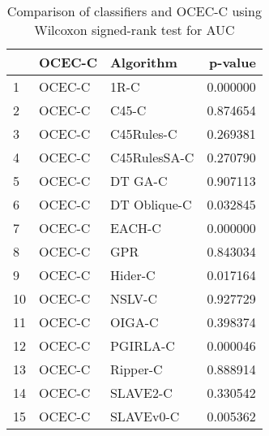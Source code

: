 \begin{table}
\footnotesize
\caption{Comparison of classifiers and OCEC-C using Wilcoxon signed-rank test for AUC}
\label{tab:OCEC-C wilcoxon AUC comparison}
\begin{tabular}{lllr}
\hline
 & OCEC-C & Algorithm & p-value \\
\hline
1 & OCEC-C & 1R-C & 0.000000 \\
2 & OCEC-C & C45-C & 0.874654 \\
3 & OCEC-C & C45Rules-C & 0.269381 \\
4 & OCEC-C & C45RulesSA-C & 0.270790 \\
5 & OCEC-C & DT GA-C & 0.907113 \\
6 & OCEC-C & DT Oblique-C & 0.032845 \\
7 & OCEC-C & EACH-C & 0.000000 \\
8 & OCEC-C & GPR & 0.843034 \\
9 & OCEC-C & Hider-C & 0.017164 \\
10 & OCEC-C & NSLV-C & 0.927729 \\
11 & OCEC-C & OIGA-C & 0.398374 \\
12 & OCEC-C & PGIRLA-C & 0.000046 \\
13 & OCEC-C & Ripper-C & 0.888914 \\
14 & OCEC-C & SLAVE2-C & 0.330542 \\
15 & OCEC-C & SLAVEv0-C & 0.005362 \\
\hline
\end{tabular}
\end{table}

